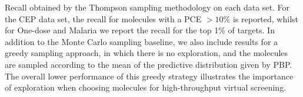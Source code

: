 Recall obtained by the Thompson sampling methodology on each data set. For the CEP data set, the recall for molecules with a PCE $>10\%$ is reported, whilst for One-dose and Malaria we report the recall for the top 1\% of targets. In addition to the Monte Carlo sampling baseline, we also include results for a greedy sampling approach, in which there is no exploration, and the molecules are sampled according to the mean of the predictive distribution given by PBP. The overall lower performance of this greedy strategy illustrates the importance of exploration when choosing molecules for high-throughput virtual screening.\label{fig:thompson_1pc}